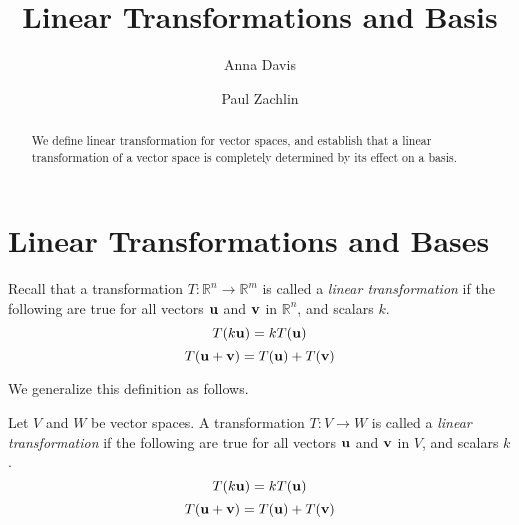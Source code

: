 \documentclass{ximera}
\author{Anna Davis \and Paul Zachlin} \title{Linear Transformations and Basis} \license{CC-BY 4.0}
\begin{document}
\begin{abstract}
We define linear transformation for vector spaces, and  establish that a linear transformation of a vector space is completely determined by its effect on a basis. 
\end{abstract}
\maketitle

\section*{Linear Transformations and Bases}

Recall that a transformation $T:\mathbb{R}^n\rightarrow \mathbb{R}^m$ is called a {\it linear transformation} if the following are true for all vectors ${\bf u}$ and ${\bf v}$ in $\mathbb{R}^n$, and scalars $k$.
\begin{equation*}
T(k{\bf u})= kT({\bf u})
\end{equation*}
\begin{equation*}
T({\bf u}+{\bf v})= T({\bf u})+T({\bf v})
\end{equation*}

We generalize this definition as follows.

\begin{definition}\label{def:lintransgeneral}
Let $V$ and $W$ be vector spaces. A transformation $T:V\rightarrow W$ is called a {\it linear transformation} if the following are true for all vectors ${\bf u}$ and ${\bf v}$ in $V$, and scalars $k$.
\begin{equation*}
T(k{\bf u})= kT({\bf u})
\end{equation*}
\begin{equation*}
T({\bf u}+{\bf v})= T({\bf u})+T({\bf v})
\end{equation*}
\end{definition}
\end{document}
